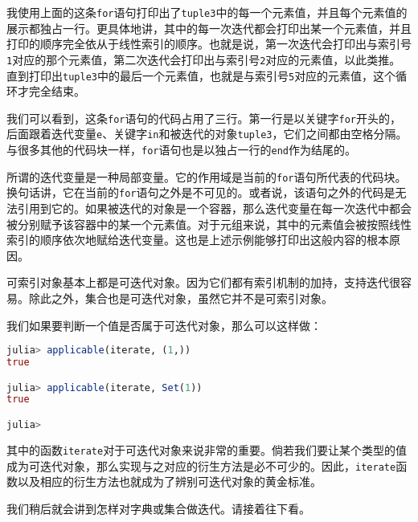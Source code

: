 我使用上面的这条\verb`for`语句打印出了\verb`tuple3`中的每一个元素值，并且每个元素值的展示都独占一行。更具体地讲，其中的每一次迭代都会打印出某一个元素值，并且打印的顺序完全依从于线性索引的顺序。也就是说，第一次迭代会打印出与索引号\verb`1`对应的那个元素值，第二次迭代会打印出与索引号\verb`2`对应的元素值，以此类推。直到打印出\verb`tuple3`中的最后一个元素值，也就是与索引号\verb`5`对应的元素值，这个循环才完全结束。

我们可以看到，这条\verb`for`语句的代码占用了三行。第一行是以关键字\verb`for`开头的，后面跟着迭代变量\verb`e`、关键字\verb`in`和被迭代的对象\verb`tuple3`，它们之间都由空格分隔。与很多其他的代码块一样，\verb`for`语句也是以独占一行的\verb`end`作为结尾的。

所谓的迭代变量是一种局部变量。它的作用域是当前的\verb`for`语句所代表的代码块。换句话讲，它在当前的\verb`for`语句之外是不可见的。或者说，该语句之外的代码是无法引用到它的。如果被迭代的对象是一个容器，那么迭代变量在每一次迭代中都会被分别赋予该容器中的某一个元素值。对于元组来说，其中的元素值会被按照线性索引的顺序依次地赋给迭代变量。这也是上述示例能够打印出这般内容的根本原因。

可索引对象基本上都是可迭代对象。因为它们都有索引机制的加持，支持迭代很容易。除此之外，集合也是可迭代对象，虽然它并不是可索引对象。

我们如果要判断一个值是否属于可迭代对象，那么可以这样做：
\begin{lstlisting}[language=julia]
julia> applicable(iterate, (1,))
true

julia> applicable(iterate, Set(1))
true

julia> 
\end{lstlisting}

其中的函数\verb`iterate`对于可迭代对象来说非常的重要。倘若我们要让某个类型的值成为可迭代对象，那么实现与之对应的衍生方法是必不可少的。因此，\verb`iterate`函数以及相应的衍生方法也就成为了辨别可迭代对象的黄金标准。

我们稍后就会讲到怎样对字典或集合做迭代。请接着往下看。
